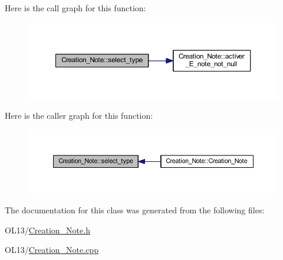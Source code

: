 Here is the call graph for this function\+:\nopagebreak
\begin{figure}[H]
\begin{center}
\leavevmode
\includegraphics[width=350pt]{class_creation___note_a4627e5957db87af2b7c43937857e9d6e_cgraph}
\end{center}
\end{figure}
Here is the caller graph for this function\+:\nopagebreak
\begin{figure}[H]
\begin{center}
\leavevmode
\includegraphics[width=350pt]{class_creation___note_a4627e5957db87af2b7c43937857e9d6e_icgraph}
\end{center}
\end{figure}


The documentation for this class was generated from the following files\+:\begin{DoxyCompactItemize}
\item 
O\+L13/\hyperlink{_creation___note_8h}{Creation\+\_\+\+Note.\+h}\item 
O\+L13/\hyperlink{_creation___note_8cpp}{Creation\+\_\+\+Note.\+cpp}\end{DoxyCompactItemize}
